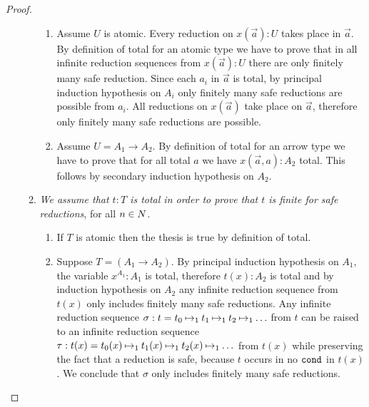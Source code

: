 \begin{proof}
\begin{enumerate}
\begin{enumerate}
\begin{enumerate}
\item
Assume $U$ is atomic. Every reduction on $x(\vec{a}):U$
takes place in $\vec{a}$. By definition of total
for an atomic type we have to prove that in all infinite reduction sequences from $x(\vec{a}):U$ 
there are only finitely many safe reduction. 
Since each $a_i$ in $\vec{a}$ is total, by principal induction hypothesis on $A_i$ 
only finitely many safe reductions are possible from $a_i$. 
All reductions on $x(\vec{a})$ take place on $\vec{a}$, therefore
only finitely many safe reductions are possible. 
\item
Assume $U = A_1 \to A_2$. By definition of total
for an arrow type we have to prove that for all total $a$ we have  $x(\vec{a},a):A_2$ total.
This follows by secondary induction hypothesis on $A_2$.
\end{enumerate}

\item
\emph{We assume that  $t:T$ is total in order to prove that $t$ is finite for safe reductions},
for all $n \in {N}$.
\begin{enumerate}
\item
If $T$ is atomic then the thesis is true by definition of total.
\item
Suppose $T = (A_1 \rightarrow A_2)$. By principal induction hypothesis on $A_1$,
the variable 
$x^{A_1}:A_1$ is total, therefore $t(x):A_2$ is total and by induction hypothesis on $A_2$
any infinite reduction sequence from $t(x)$ only includes finitely many safe reductions. 
Any infinite reduction sequence 
$\sigma: t = t_0 \mathbin{\mapsto}_1 t_1 \mathbin{\mapsto}_1 t_2 \mathbin{\mapsto}_1 \ldots$  from $t$ 
can be raised to an infinite reduction sequence 
$\tau: t(x) = t_0(x) \mathbin{\mapsto}_1 t_1(x) \mathbin{\mapsto}_1 t_2(x) \mathbin{\mapsto}_1 \ldots$ from $t(x)$
while preserving the fact that a reduction is safe, because $t$ occurs in no ${\tt cond}$ in $t(x)$.
We conclude that $\sigma$ only includes finitely many safe reductions. 
\end{enumerate}
\end{enumerate}


\end{enumerate}
\end{proof}
